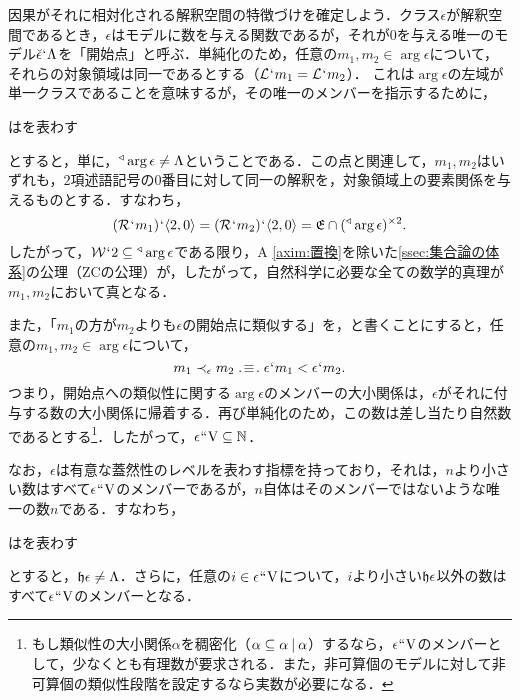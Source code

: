 因果がそれに相対化される解釈空間の特徴づけを確定しよう．クラス$\epsilon$が解釈空間であるとき，$\epsilon$はモデルに数を与える関数であるが，それが$0$を与える唯一のモデル$\breve{\epsilon}{\mspace{1mu}{`}\mspace{1mu}} \Lambda$を「開始点」と呼ぶ．単純化のため，任意の$m_1,m_2\in\arg\epsilon$について，それらの対象領域は同一であるとする（$\mathcal{L}{\mspace{1mu}{`}\mspace{1mu}} m_1 = \mathcal{L}{\mspace{1mu}{`}\mspace{1mu}} m_2$）．
これは$\arg\epsilon$の左域が単一クラスであることを意味するが，その唯一のメンバーを指示するために，
\begin{df}
\label{df:トライアングル}
\kagi{$
    \trgl{\alpha}
$}はを表わす
\end{df}
\noindent とすると，単に，$ {^\triangleleft}\arg\epsilon\neq \Lambda $ということである．この点と関連して，$m_1,m_2$はいずれも，$2$項述語記号の$0$番目に対して同一の解釈を，対象領域上の要素関係を与えるものとする．すなわち，
\[
    (\mathcal{R}{\mspace{1mu}{`}\mspace{1mu}} m_1){\mspace{1mu}{`}\mspace{1mu}} \langle 2,0 \rangle = (\mathcal{R}{\mspace{1mu}{`}\mspace{1mu}} m_2){\mspace{1mu}{`}\mspace{1mu}} \langle 2,0 \rangle = \mathfrak{E}\cap({^\triangleleft}\arg\epsilon)^{\times 2}.
\]
したがって，$ \mathcal{W}{\mspace{1mu}{`}\mspace{1mu}} 2\subseteq{^\triangleleft}\arg\epsilon $である限り，A \ref{axim:置換}を除いた\ref{ssec:集合論の体系}の公理（ZCの公理）が，したがって，自然科学に必要な全ての数学的真理が$m_1,m_2$において真となる．

また，「$m_1$の方が$m_2$よりも$\epsilon$の開始点に類似する」を，と書くことにすると，任意の$m_1,m_2\in\arg\epsilon$について，
\[
   m_1 \prec_{\epsilon} m_2 \case{3}{1}{1} \epsilon\fap m_1 < \epsilon\fap m_2.
\]
つまり，開始点への類似性に関する$\arg\epsilon$のメンバーの大小関係は，$\epsilon$がそれに付与する数の大小関係に帰着する．再び単純化のため，この数は差し当たり自然数であるとする\footnote{
    もし類似性の大小関係$\alpha$を稠密化（$\alpha\subseteq\alpha\mathbin{\mid}\alpha$）するなら，$\epsilon{\mspace{1mu}{``}\mspace{1mu}}\mathrm{V}$のメンバーとして，少なくとも有理数が要求される．また，非可算個のモデルに対して非可算個の類似性段階を設定するなら実数が必要になる．
}．したがって，$\epsilon{\mspace{1mu}{``}\mspace{1mu}}\mathrm{V}\subseteq\mathbb{N}$．

なお，$\epsilon$は有意な蓋然性のレベルを表わす指標を持っており，それは，$n$より小さい数はすべて$\epsilon{\mspace{1mu}{``}\mspace{1mu}}\mathrm{V}$のメンバーであるが，$n$自体はそのメンバーではないような唯一の数$n$である．すなわち，
\begin{df}
\label{df:有意指標}
\kagi{$
    \indx{\epsilon}
$}はを表わす
\end{df}
\noindent とすると，$\mathfrak{h}\epsilon\neq \Lambda$．さらに，任意の$i\in\epsilon{\mspace{1mu}{``}\mspace{1mu}}\mathrm{V}$について，$i$より小さい$\indx{\epsilon}$以外の数はすべて$\epsilon{\mspace{1mu}{``}\mspace{1mu}}\mathrm{V}$のメンバーとなる．

